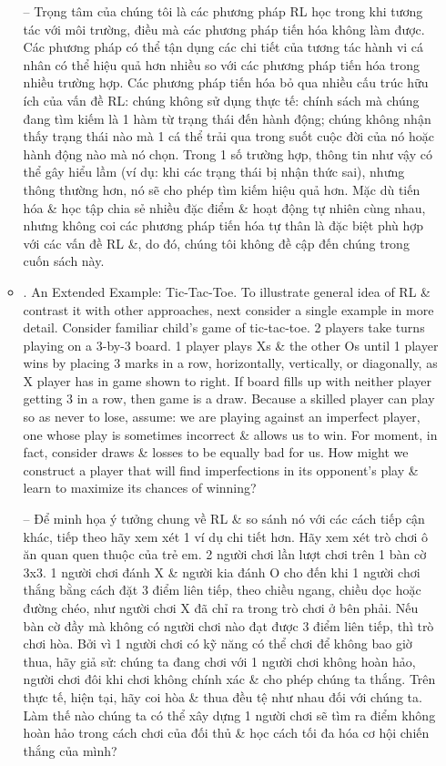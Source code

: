 \documentclass{article}
\begin{document}
\begin{itemize}
\begin{itemize}
        -- Trọng tâm của chúng tôi là các phương pháp RL học trong khi tương tác với môi trường, điều mà các phương pháp tiến hóa không làm được. Các phương pháp có thể tận dụng các chi tiết của tương tác hành vi cá nhân có thể hiệu quả hơn nhiều so với các phương pháp tiến hóa trong nhiều trường hợp. Các phương pháp tiến hóa bỏ qua nhiều cấu trúc hữu ích của vấn đề RL: chúng không sử dụng thực tế: chính sách mà chúng đang tìm kiếm là 1 hàm từ trạng thái đến hành động; chúng không nhận thấy trạng thái nào mà 1 cá thể trải qua trong suốt cuộc đời của nó hoặc hành động nào mà nó chọn. Trong 1 số trường hợp, thông tin như vậy có thể gây hiểu lầm (ví dụ: khi các trạng thái bị nhận thức sai), nhưng thông thường hơn, nó sẽ cho phép tìm kiếm hiệu quả hơn. Mặc dù tiến hóa \& học tập chia sẻ nhiều đặc điểm \& hoạt động tự nhiên cùng nhau, nhưng không coi các phương pháp tiến hóa tự thân là đặc biệt phù hợp với các vấn đề RL \&, do đó, chúng tôi không đề cập đến chúng trong cuốn sách này.
        \item {. An Extended Example: Tic-Tac-Toe.} To illustrate general idea of RL \& contrast it with other approaches, next consider a single example in more detail. Consider familiar child's game of tic-tac-toe. 2 players take turns playing on a 3-by-3 board. 1 player plays Xs \& the other Os until 1 player wins by placing 3 marks in a row, horizontally, vertically, or diagonally, as X player has in game shown to right. If board fills up with neither player getting 3 in a row, then game is a draw. Because a skilled player can play so as never to lose, assume: we are playing against an imperfect player, one whose play is sometimes incorrect \& allows us to win. For moment, in fact, consider draws \& losses to be equally bad for us. How might we construct a player that will find imperfections in its opponent's play \& learn to maximize its chances of winning?

        -- Để minh họa ý tưởng chung về RL \& so sánh nó với các cách tiếp cận khác, tiếp theo hãy xem xét 1 ví dụ chi tiết hơn. Hãy xem xét trò chơi ô ăn quan quen thuộc của trẻ em. 2 người chơi lần lượt chơi trên 1 bàn cờ 3x3. 1 người chơi đánh X \& người kia đánh O cho đến khi 1 người chơi thắng bằng cách đặt 3 điểm liên tiếp, theo chiều ngang, chiều dọc hoặc đường chéo, như người chơi X đã chỉ ra trong trò chơi ở bên phải. Nếu bàn cờ đầy mà không có người chơi nào đạt được 3 điểm liên tiếp, thì trò chơi hòa. Bởi vì 1 người chơi có kỹ năng có thể chơi để không bao giờ thua, hãy giả sử: chúng ta đang chơi với 1 người chơi không hoàn hảo, người chơi đôi khi chơi không chính xác \& cho phép chúng ta thắng. Trên thực tế, hiện tại, hãy coi hòa \& thua đều tệ như nhau đối với chúng ta. Làm thế nào chúng ta có thể xây dựng 1 người chơi sẽ tìm ra điểm không hoàn hảo trong cách chơi của đối thủ \& học cách tối đa hóa cơ hội chiến thắng của mình?


\end{itemize}
\end{itemize}
\end{document}
